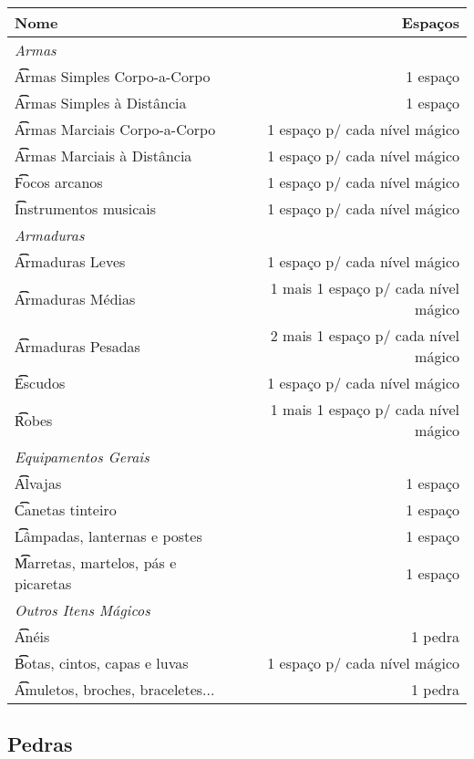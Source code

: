 \documentclass{RPG_Adventure}[2021/10/20]
\begin{document}
\begin{center}
\begin{tabular}{lr}
    \textbf{Nome} & \textbf{Espaços} \\
    \hline
    \multicolumn{2}{l}{\t\textit{Armas}} \\
    \t\t Armas Simples Corpo-a-Corpo & 1 espaço \\
    \t\t Armas Simples à Distância & 1 espaço \\
    \t\t Armas Marciais Corpo-a-Corpo & 1 espaço p/ cada nível mágico \\
    \t\t Armas Marciais à Distância & 1 espaço p/ cada nível mágico \\
    \t\t Focos arcanos & 1 espaço p/ cada nível mágico \\
    \t\t Instrumentos musicais & 1 espaço p/ cada nível mágico \\
    \hline
    \multicolumn{2}{l}{\t\textit{Armaduras}} \\
    \t\t Armaduras Leves & 1 espaço p/ cada nível mágico \\
    \t\t Armaduras Médias & 1 mais 1 espaço p/ cada nível mágico \\
    \t\t Armaduras Pesadas & 2 mais 1 espaço p/ cada nível mágico \\
    \t\t Escudos & 1 espaço p/ cada nível mágico \\
    \t\t Robes & 1 mais 1 espaço p/ cada nível mágico \\
    \hline
    \multicolumn{2}{l}{\t\textit{Equipamentos Gerais}} \\
    \t\t Alvajas & 1 espaço \\
    \t\t Canetas tinteiro & 1 espaço \\
    \t\t Lâmpadas, lanternas e postes & 1 espaço \\
    \t\t Marretas, martelos, pás e picaretas & 1 espaço \\
    \hline
    \multicolumn{2}{l}{\t\textit{Outros Itens Mágicos}} \\
    \t\t Anéis & 1 pedra \\
    \t\t Botas, cintos, capas e luvas & 1 espaço p/ cada nível mágico \\
    \t\t Amuletos, broches, braceletes... & 1 pedra \\

\end{tabular}
\end{center}

\subsection*{Pedras}%
\end{document}
